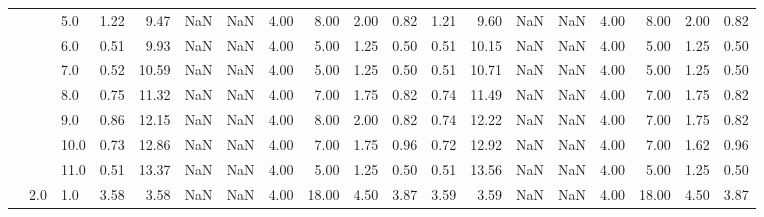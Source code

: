 \begin{tabular}{lllrrrrrrrrrrrrrrrr}
       &     & 5.0  &      1.22 &       9.47 &               NaN &                NaN & 4.00 &   8.00 &             2.00 &                         0.82 &      1.21 &       9.60 &               NaN &                NaN & 4.00 &   8.00 &             2.00 &                         0.82 \\
       &     & 6.0  &      0.51 &       9.93 &               NaN &                NaN & 4.00 &   5.00 &             1.25 &                         0.50 &      0.51 &      10.15 &               NaN &                NaN & 4.00 &   5.00 &             1.25 &                         0.50 \\
       &     & 7.0  &      0.52 &      10.59 &               NaN &                NaN & 4.00 &   5.00 &             1.25 &                         0.50 &      0.51 &      10.71 &               NaN &                NaN & 4.00 &   5.00 &             1.25 &                         0.50 \\
       &     & 8.0  &      0.75 &      11.32 &               NaN &                NaN & 4.00 &   7.00 &             1.75 &                         0.82 &      0.74 &      11.49 &               NaN &                NaN & 4.00 &   7.00 &             1.75 &                         0.82 \\
       &     & 9.0  &      0.86 &      12.15 &               NaN &                NaN & 4.00 &   8.00 &             2.00 &                         0.82 &      0.74 &      12.22 &               NaN &                NaN & 4.00 &   7.00 &             1.75 &                         0.82 \\
       &     & 10.0 &      0.73 &      12.86 &               NaN &                NaN & 4.00 &   7.00 &             1.75 &                         0.96 &      0.72 &      12.92 &               NaN &                NaN & 4.00 &   7.00 &             1.62 &                         0.96 \\
       &     & 11.0 &      0.51 &      13.37 &               NaN &                NaN & 4.00 &   5.00 &             1.25 &                         0.50 &      0.51 &      13.56 &               NaN &                NaN & 4.00 &   5.00 &             1.25 &                         0.50 \\
       & 2.0 & 1.0  &      3.58 &       3.58 &               NaN &                NaN & 4.00 &  18.00 &             4.50 &                         3.87 &      3.59 &       3.59 &               NaN &                NaN & 4.00 &  18.00 &             4.50 &                         3.87 \\

\end{tabular}
